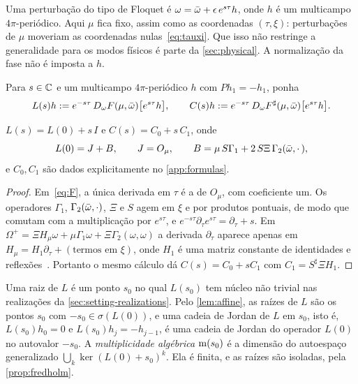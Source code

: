 Uma perturbação do tipo de Floquet é $\omega=\bar\omega+\epsilon\,e^{s\tau}h$, onde $h$ é um multicampo
$4\pi$-periódico. Aqui $\mu$ fica fixo, assim como as coordenadas $(\tau,\xi)$: perturbações de $\mu$
moveriam as coordenadas nulas~\eqref{eq:tauxi}. Que isso não restringe a generalidade para os modos físicos é
parte da \cref{sec:physical}. A normalização da fase não é imposta a $h$.

\begin{definition}\label{def:L}
Para $s\in\mathbb{C}$ e um multicampo $4\pi$-periódico $h$ com $Ph_1=-h_1$, ponha
\[
  L(s)h:=e^{-s\tau}\,D_\omega F(\mu,\bar\omega)\big[e^{s\tau}h\big],\qquad
  C(s)h:=e^{-s\tau}\,D_\omega F^\sharp(\mu,\bar\omega)\big[e^{s\tau}h\big].
\]
\end{definition}

\begin{lemma}\label{lem:affine}
$L(s)=L(0)+s\,I$ e $C(s)=C_0+s\,C_1$, onde
\[
  L(0)=J+B,\qquad J=O_\mu,\qquad B=\mu\,S\Gamma_1+2\,S\Xi\,\Gamma_2(\bar\omega,\cdot\,),
\]
e $C_0,C_1$ são dados explicitamente no \cref{app:formulas}.
\end{lemma}

\begin{proof}
Em~\eqref{eq:F}, a única derivada em $\tau$ é a de $O_\mu$, com coeficiente um. Os operadores
$\Gamma_1$, $\Gamma_2(\bar\omega,\cdot)$, $\Xi$ e $S$ agem em $\xi$ e por produtos pontuais, de modo que
comutam com a multiplicação por $e^{s\tau}$, e $e^{-s\tau}\partial_\tau e^{s\tau}=\partial_\tau+s$. Em
$\Omega^+=\Xi H_\mu\omega+\mu\Gamma_1\omega+\Xi\Gamma_2(\omega,\omega)$ a derivada $\partial_\tau$ aparece
apenas em $H_\mu=H_1\partial_\tau+(\text{termos em }\xi)$, onde $H_1$ é uma matriz constante de identidades e
reflexões~\cite[\S\S2--3]{RT2019}. Portanto o mesmo cálculo dá $C(s)=C_0+sC_1$ com
$C_1=S^\sharp\Xi H_1$.
\end{proof}

Uma raiz de $L$ é um ponto $s_0$ no qual $L(s_0)$ tem núcleo não trivial nas realizações da
\cref{sec:setting-realizations}. Pelo \cref{lem:affine}, as raízes de $L$ são os pontos $s_0$ com
$-s_0\in\sigma(L(0))$, e uma cadeia de Jordan de $L$ em $s_0$, isto é, $L(s_0)h_0=0$ e
$L(s_0)h_j=-h_{j-1}$, é uma cadeia de Jordan do operador $L(0)$ no autovalor $-s_0$. A
\emph{multiplicidade algébrica} $\operatorname{m}(s_0)$ é a dimensão do autoespaço generalizado
$\bigcup_k\ker(L(0)+s_0)^k$. Ela é finita, e as raízes são isoladas, pela \cref{prop:fredholm}.

